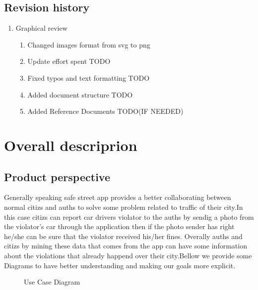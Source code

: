 \documentclass{article}
\begin{document}
	\subsection{Revision history}
		\begin{enumerate}
			\item Graphical review
			\begin{enumerate}[label*=\arabic*.]
				\item Changed images format from svg to png
				\item Update effort spent TODO
				\item Fixed typos and text formatting	TODO
				\item Added document structure	TODO
				\item Added Reference Documents	TODO(IF NEEDED)
			\end{enumerate}
		\end{enumerate}

\newpage
\section{Overall descriprion}

	

	\subsection{Product perspective} Generally speaking safe street app provides a better collaborating between normal citizs and auths to solve some problem related to traffic of their city.In this case citizs can report car drivers violator to the auths by sendig a photo from the violator's car through the application then if the photo sender has right he/she can be sure that the violator received his/her fines. Overally auths and citizs by mining these data that comes from the app can have some information about the violations that already happend over their city.Bellow we provide some Diagrams to have better understanding and making our goals more explicit.
	
	\begin{figure}[H]
		\centering
		\def\svgwidth{\columnwidth}
		
		\caption{Use Case Diagram}
	\end{figure}
\end{document}
